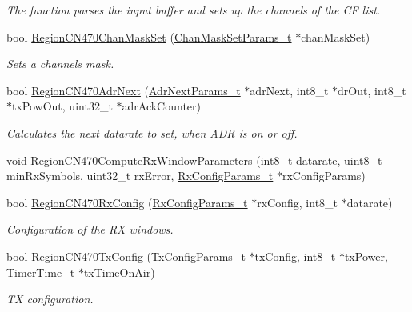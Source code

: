 \begin{DoxyCompactItemize}
\begin{DoxyCompactList}\small\item\em The function parses the input buffer and sets up the channels of the CF list. \end{DoxyCompactList}\item 
bool \hyperlink{group__REGIONCN470_ga361aa9a80854b1a264a9ad0720cbd4da}{Region\+C\+N470\+Chan\+Mask\+Set} (\hyperlink{group__REGION_ga6d24f7da136006410827dfb29f6b9b9e}{Chan\+Mask\+Set\+Params\+\_\+t} $\ast$chan\+Mask\+Set)
\begin{DoxyCompactList}\small\item\em Sets a channels mask. \end{DoxyCompactList}\item 
bool \hyperlink{group__REGIONCN470_ga5205fdda3f4a869d78f4ccd791de359e}{Region\+C\+N470\+Adr\+Next} (\hyperlink{group__REGION_ga567c2742622326b350b4e91bbf61b4ce}{Adr\+Next\+Params\+\_\+t} $\ast$adr\+Next, int8\+\_\+t $\ast$dr\+Out, int8\+\_\+t $\ast$tx\+Pow\+Out, uint32\+\_\+t $\ast$adr\+Ack\+Counter)
\begin{DoxyCompactList}\small\item\em Calculates the next datarate to set, when A\+DR is on or off. \end{DoxyCompactList}\item 
void \hyperlink{group__REGIONCN470_gabb50864b958d868d7c2fbb09a7238a23}{Region\+C\+N470\+Compute\+Rx\+Window\+Parameters} (int8\+\_\+t datarate, uint8\+\_\+t min\+Rx\+Symbols, uint32\+\_\+t rx\+Error, \hyperlink{group__REGION_ga375c038078dfcfc7ef14280021db719e}{Rx\+Config\+Params\+\_\+t} $\ast$rx\+Config\+Params)
\item 
bool \hyperlink{group__REGIONCN470_gadb4b05f4e7b55705e37156add3ed585b}{Region\+C\+N470\+Rx\+Config} (\hyperlink{group__REGION_ga375c038078dfcfc7ef14280021db719e}{Rx\+Config\+Params\+\_\+t} $\ast$rx\+Config, int8\+\_\+t $\ast$datarate)
\begin{DoxyCompactList}\small\item\em Configuration of the RX windows. \end{DoxyCompactList}\item 
bool \hyperlink{group__REGIONCN470_ga2de0fae78c1759fec62a835b0fcb3829}{Region\+C\+N470\+Tx\+Config} (\hyperlink{group__REGION_gabed730d4d04b0b60d4b6d1966d3f21d3}{Tx\+Config\+Params\+\_\+t} $\ast$tx\+Config, int8\+\_\+t $\ast$tx\+Power, \hyperlink{utilities_8h_a4215ca43d3e953099ea758ce428599d0}{Timer\+Time\+\_\+t} $\ast$tx\+Time\+On\+Air)
\begin{DoxyCompactList}\small\item\em TX configuration. \end{DoxyCompactList}\item 

\end{DoxyCompactItemize}
